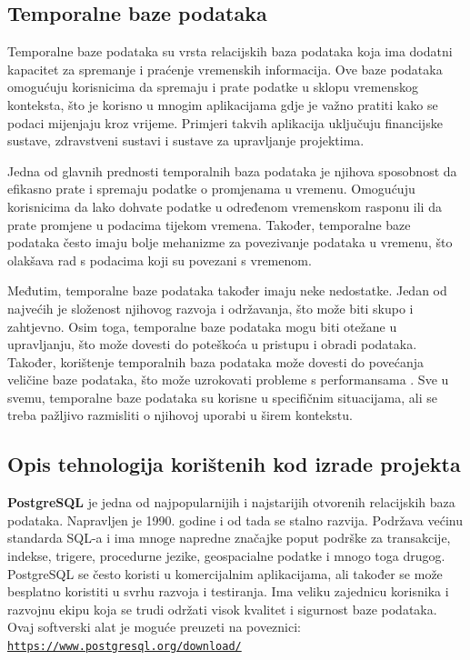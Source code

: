 \documentclass[]{foi}
\begin{document}
\subsection{Temporalne baze podataka}

Temporalne baze podataka \cite{tbp} su vrsta relacijskih baza podataka koja ima dodatni kapacitet za spremanje i praćenje vremenskih informacija. Ove baze podataka omogućuju korisnicima da spremaju i prate podatke u sklopu vremenskog konteksta, što je korisno u mnogim aplikacijama gdje je važno pratiti kako se podaci mijenjaju kroz vrijeme. Primjeri takvih aplikacija uključuju financijske sustave, zdravstveni sustavi i sustave za upravljanje projektima.

Jedna od glavnih prednosti temporalnih baza podataka je njihova sposobnost da efikasno prate i spremaju podatke o promjenama u vremenu. Omogućuju korisnicima da lako dohvate podatke u određenom vremenskom rasponu ili da prate promjene u podacima tijekom vremena. Također, temporalne baze podataka često imaju bolje mehanizme za povezivanje podataka u vremenu, što olakšava rad s podacima koji su povezani s vremenom.

Međutim, temporalne baze podataka također imaju neke nedostatke. Jedan od najvećih je složenost njihovog razvoja i održavanja, što može biti skupo i zahtjevno. Osim toga, temporalne baze podataka mogu biti otežane u upravljanju, što može dovesti do poteškoća u pristupu i obradi podataka. Također, korištenje temporalnih baza podataka može dovesti do povećanja veličine baze podataka, što može uzrokovati probleme s performansama \cite{tbp}. Sve u svemu, temporalne baze podataka su korisne u specifičnim situacijama, ali se treba pažljivo razmisliti o njihovoj uporabi u širem kontekstu.
\newpage

\subsection{Opis tehnologija korištenih kod izrade projekta}

\textbf{PostgreSQL} \cite{postgres} je jedna od najpopularnijih i najstarijih otvorenih relacijskih baza podataka. Napravljen je 1990. godine i od tada se stalno razvija. Podržava većinu standarda SQL-a i ima mnoge napredne značajke poput podrške za transakcije, indekse, trigere, procedurne jezike, geospacialne podatke i mnogo toga drugog. PostgreSQL se često koristi u komercijalnim aplikacijama, ali također se može besplatno koristiti u svrhu razvoja i testiranja. Ima veliku zajednicu korisnika i razvojnu ekipu koja se trudi održati visok kvalitet i sigurnost baze podataka. Ovaj softverski alat je moguće preuzeti na poveznici:\\ \texttt{\href{https://www.postgresql.org/download/}{https://www.postgresql.org/download/}}
\end{document}
